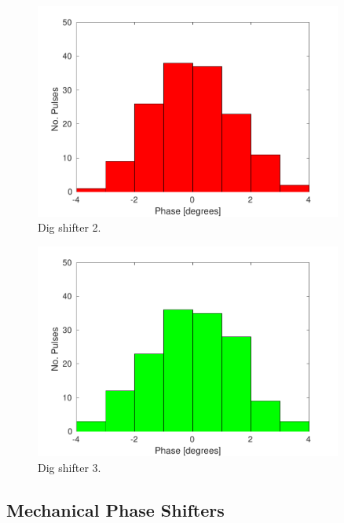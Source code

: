 \begin{figure}
  \centering
  \includegraphics[width=0.9\textwidth]{Figures/phaseMons/PhMon_HistDig2}
  \caption{Dig shifter 2.}
  \label{f:PhMon_HistDig2}
\end{figure}

\begin{figure}
  \centering
  \includegraphics[width=0.9\textwidth]{Figures/phaseMons/PhMon_HistDig3}
  \caption{Dig shifter 3.}
  \label{f:PhMon_HistDig3}
\end{figure}

\subsection{Mechanical Phase Shifters}
\label{ss:mechShiftNoise}

